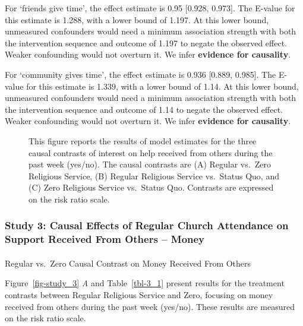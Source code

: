 \documentclass[
  single column]{article}
\makeatletter
\let\oldparagraph\paragraph
\renewcommand{\paragraph}{
    \@ifstar
      \xxxParagraphStar
      \xxxParagraphNoStar
  }
\newcommand{\xxxParagraphStar}[1]{\oldparagraph*{#1}\mbox{}}
\newcommand{\xxxParagraphNoStar}[1]{\oldparagraph{#1}\mbox{}}
\makeatother
\begin{document}
For `friends give time', the effect estimate is 0.95 {[}0.928, 0.973{]}.
The E-value for this estimate is 1.288, with a lower bound of 1.197. At
this lower bound, unmeasured confounders would need a minimum
association strength with both the intervention sequence and outcome of
1.197 to negate the observed effect. Weaker confounding would not
overturn it. We infer \textbf{evidence for causality}.

For `community gives time', the effect estimate is 0.936 {[}0.889,
0.985{]}. The E-value for this estimate is 1.339, with a lower bound of
1.14. At this lower bound, unmeasured confounders would need a minimum
association strength with both the intervention sequence and outcome of
1.14 to negate the observed effect. Weaker confounding would not
overturn it. We infer \textbf{evidence for causality}.

\begin{figure}


\caption{\label{fig-study2}This figure reports the results of model
estimates for the three causal contrasts of interest on help received
from others during the past week (yes/no). The causal contrasts are (A)
Regular vs.~Zero Religious Service, (B) Regular Religious Service
vs.~Status Quo, and (C) Zero Religious Service vs.~Status Quo. Contrasts
are expressed on the risk ratio scale.}

\end{figure}%

\newpage{}

\subsubsection{Study 3: Causal Effects of Regular Church Attendance on
Support Received From Others --
Money}\label{study-3-causal-effects-of-regular-church-attendance-on-support-received-from-others-money}

\paragraph{Regular vs.~Zero Causal Contrast on Money Received From
Others}\label{regular-vs.-zero-causal-contrast-on-money-received-from-others}

Figure~\ref{fig-study_3} \emph{A} and Table~\ref{tbl-3_1} present
results for the treatment contrasts between Regular Religious Service
and Zero, focusing on money received from others during the past week
(yes/no). These results are measured on the risk ratio scale.
\end{document}
